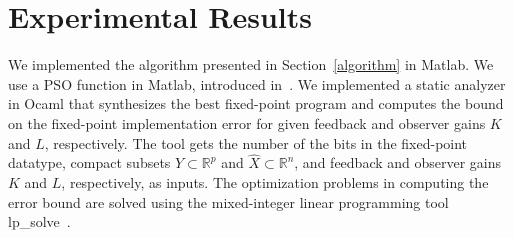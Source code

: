 \documentclass{amsart}
\numberwithin{equation}{section}
\newcommand{\R}{{\mathbb{R}}}
\begin{document}
\begin{small}
\begin{table*}[t]
\begin{center}
\caption{Least upper bound ($lub$) on the LQR cost (\ref{LQR_cost}), for a given initial condition $x$, the LQG cost (\ref{LQG}), and the Euclidean norm of the steady state error for the LQR-LQG and the synthesized gains.}
\label{table-exp2}
\end{center}
\end{table*}
\end{small}

\section{Experimental Results}
We implemented the algorithm presented in Section~\ref{algorithm} in Matlab. 
We use a PSO function in Matlab, introduced in~\cite{ebbesen}.
We implemented a static analyzer in Ocaml that synthesizes the best fixed-point program and computes the 
bound on the fixed-point implementation error for given feedback and observer gains $K$ and $L$, respectively. 
The tool gets the number of the bits in the fixed-point datatype, compact subsets $Y\subset\R^p$ and $\widehat{X}\subset\R^n$, 
and feedback and observer gains $K$ and $L$, respectively, as inputs. 
The optimization problems in computing the error bound are solved using the mixed-integer linear programming tool {\sf lp\_solve}~\cite{lpsolve}. 
\end{document}
